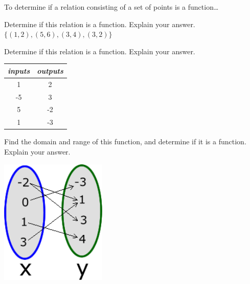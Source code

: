 \begin{myConceptSteps}{To determine if a relation consisting of a set of points is a function\dots}
\end{myConceptSteps}




\begin{myExample}{
    Determine if this relation is a function. Explain your answer.
    \(
        \{ (1,2), (5,6), (3,4), (3,2) \}
    \)
}
    \vspace{1in}
\end{myExample}

\begin{myExample}{
    Determine if this relation is a function. Explain your answer.
    \begin{center}
    \begin{tabular}{cc}
            \toprule
            \emph{inputs} & \emph{outputs} \\
            \midrule
            1 & 2\\
            -5 & 3\\
            5 & -2\\
            1 & -3\\
            \bottomrule
    \end{tabular}
    \end{center}
}
    \vspace{1in}
\end{myExample}

\begin{myExample}{
    Find the domain and range of this function, and determine if it is a function. 
    Explain your answer.
    \begin{center}
    \includegraphics[width=2in]{../../common/images/domain-range-mapping.png}
    \end{center}
}
    \vspace{2.5in}
\end{myExample}
